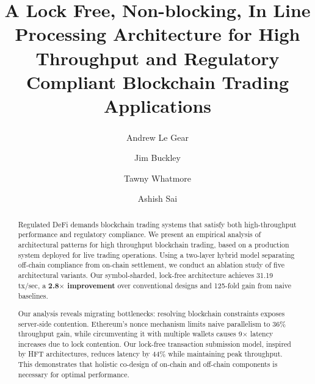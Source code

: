 \documentclass[runningheads]{llncs}
\begin{document}
%
\title{A Lock Free, Non-blocking, In Line Processing Architecture for High Throughput and Regulatory Compliant Blockchain Trading Applications}
%
%
\author{Andrew Le Gear\textsuperscript{\Letter} \and
Jim Buckley \and
Tawny Whatmore \and
Ashish Sai}
%
%
%
\maketitle
%
\begin{abstract}
Regulated DeFi demands blockchain trading systems that satisfy both high-throughput performance and regulatory compliance. We present an empirical analysis of architectural patterns for high throughput blockchain trading, based on a production system deployed for live trading operations. Using a two-layer hybrid model separating off-chain compliance from on-chain settlement, we conduct an ablation study of five architectural variants. Our symbol-sharded, lock-free architecture achieves 31.19 tx/sec, a \textbf{2.8$\times$ improvement} over conventional designs and 125-fold gain from naive baselines.

Our analysis reveals migrating bottlenecks: resolving blockchain constraints exposes server-side contention. Ethereum's nonce mechanism limits naive parallelism to 36\% throughput gain, while circumventing it with multiple wallets causes 9$\times$ latency increases due to lock contention. Our lock-free transaction submission model, inspired by HFT architectures, reduces latency by 44\% while maintaining peak throughput. This demonstrates that holistic co-design of on-chain and off-chain components is necessary for optimal performance.

\end{abstract}
%
%
%
\end{document}
